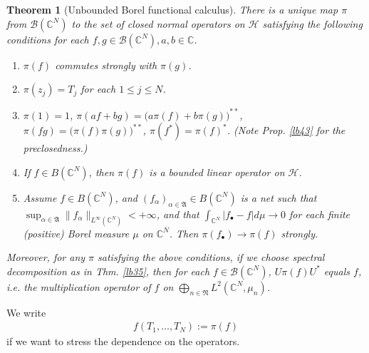 \documentclass[12pt,a4paper,notitlepage]{article}
\theoremstyle{definition}
\theoremstyle{plain}
\newtheorem{thm}[df]{Theorem}
\newcommand{\fk}{\mathfrak}
\newcommand{\mc}{\mathcal}
\newcommand{\scr}{\mathscr}
\newcommand{\blt}{\bullet}
\newcommand{\Cbb}{\mathbb C}
\numberwithin{equation}{section}
\begin{document}
\begin{thm}[Unbounded Borel functional calculus]\label{lb47}
There is a unique map $\pi$ from $\scr B(\Cbb^N)$ to the set of closed normal operators on $\mc H$ satisfying the following conditions for each $f,g\in\scr B(\Cbb^N),a,b\in\Cbb$.
\begin{enumerate}
\item $\pi(f)$ commutes strongly with $\pi(g)$.
\item $\pi(z_j)=T_j$ for each $1\leq j\leq N$.
\item $\pi(1)=1$, $\pi(af+bg)=\big(a\pi(f)+b\pi(g)\big)^{**}$, $\pi(fg)=\big(\pi(f)\pi(g)\big)^{**}$, $\pi(f^*)=\pi(f)^*$. (Note Prop. \ref{lb43} for the preclosedness.)
\item If $f\in B(\Cbb^N)$, then $\pi(f)$ is a bounded linear operator on $\mc H$.
\item Assume $f\in B(\Cbb^N)$, and $(f_\alpha)_{\alpha\in\fk A}\in B(\Cbb^N)$ is a net such that $\sup_{\alpha\in\fk A}\lVert f_\alpha\lVert_{L^\infty(\Cbb^N)}<+\infty$, and that $\int_{\Cbb^N}|f_\blt-f|d\mu\rightarrow 0$ for each finite (positive) Borel measure $\mu$ on $\Cbb^N$. Then $\pi(f_\blt)\rightarrow\pi(f)$ strongly. 
\end{enumerate}
Moreover, for any $\pi$ satisfying the above conditions, if we choose spectral decomposition as in Thm. \ref{lb35}, then for each $f\in\scr B(\Cbb^N)$, $U\pi(f)U^*$ equals $f$, i.e.  the multiplication operator of $f$ on $\bigoplus_{n\in\fk N}L^2(\Cbb^N,\mu_n)$.
\end{thm}

We write
\begin{align}
f(T_1,\dots,T_N):=\pi(f)	
\end{align}
if we want to stress the dependence on the operators.
\end{document}
